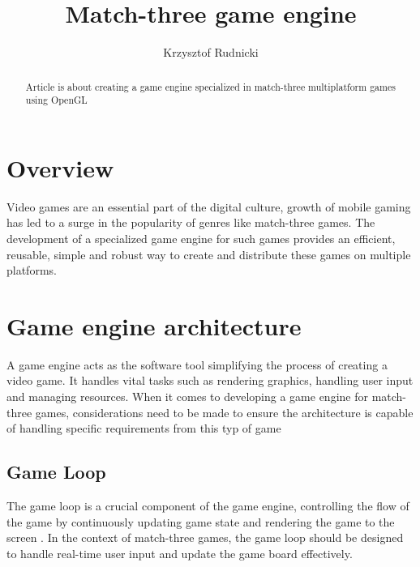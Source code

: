\documentclass[runningheads, 12pt]{llncs}
\begin{document}
\title{Match-three game engine}

\author{Krzysztof Rudnicki}



\maketitle           

\begin{abstract}
    Article is about creating a game engine specialized in match-three multiplatform games using OpenGL

\end{abstract}

\section{Overview}
Video games are an essential part of the digital culture, growth of mobile gaming has led to a surge in the popularity of genres like match-three games. The development of a specialized game engine for such games provides an efficient, reusable, simple and robust way to create and distribute these games on multiple platforms.

\section{Game engine architecture}
A game engine acts as the software tool simplifying the process of creating a video game. It handles vital tasks such as rendering graphics, handling user input and managing resources. When it comes to developing a game engine for match-three games, considerations need to be made to ensure the architecture is capable of handling specific requirements from this typ of game

\subsection{Game Loop} The game loop is a crucial component of the game engine, controlling the flow of the game by continuously updating game state and rendering the game to the screen \cite{ref_book1}. In the context of match-three games, the game loop should be designed to handle real-time user input and update the game board effectively.
\end{document}
